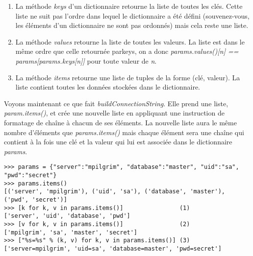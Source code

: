 \begin{enumerate}
\item La méthode \emph{keys} d'un dictionnaire retourne la liste de toutes les clés.
    Cette liste ne suit pas l'ordre dans lequel le dictionnaire a été défini
    (souvenez-vous, les éléments d'un dictionnaire ne sont pas ordonnés) mais
    cela reste une liste.
\item La méthode \emph{values} retourne la liste de toutes les valeurs. La liste est
    dans le même ordre que celle retournée parkeys, on a donc \emph{params.values()[n] == params[params.keys[n]]} pour toute valeur de \emph{n}.
\item La méthode \emph{items} retourne une liste de tuples de la forme (clé, valeur). La liste contient toutes les données stockées dans le dictionnaire.
\end{enumerate}

Voyons maintenant ce que fait \emph{buildConnectionString}. Elle prend une liste,
\emph{param.items()}, et crée une nouvelle liste en appliquant une instruction de
formatage de chaîne à chacun de ses éléments. La nouvelle liste aura le même
nombre d'éléments que \emph{params.items()} mais chaque élément sera une chaîne qui
contient à la fois une clé et la valeur qui lui est associée dans le dictionnaire \emph{params}.

\begin{example}
\begin{lstlisting}
>>> params = {"server":"mpilgrim", "database":"master", "uid":"sa", "pwd":"secret"}
>>> params.items()
[('server', 'mpilgrim'), ('uid', 'sa'), ('database', 'master'), ('pwd', 'secret')]
>>> [k for k, v in params.items()]                (1)
['server', 'uid', 'database', 'pwd']
>>> [v for k, v in params.items()]                (2)
['mpilgrim', 'sa', 'master', 'secret']
>>> ["%s=%s" % (k, v) for k, v in params.items()] (3)
['server=mpilgrim', 'uid=sa', 'database=master', 'pwd=secret']
\end{lstlisting}
\end{example}

